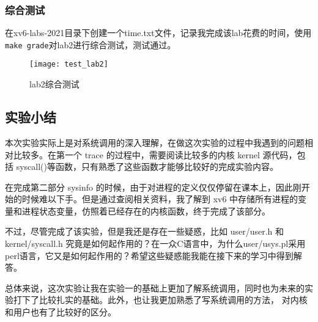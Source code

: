 \subsubsection{综合测试}

在xv6-labs-2021目录下创建一个time.txt文件，记录我完成该lab花费的时间，使用\texttt{make grade}对lab2进行综合测试，测试通过。

\begin{figure}[!htb]
	\centering
	\texttt{[image: test\_lab2]}
	\caption{lab2综合测试}
	\label{fig:test_lab2}
\end{figure}

\subsection{实验小结}

本次实验实际上是对系统调用的深入理解，在做这次实验的过程中我遇到的问题相对比较多。在第一个 trace 的过程中，需要阅读比较多的内核 kernel 源代码，包括 syscall()等函数，只有熟悉了这些函数才能够比较好的完成实验内容。

在完成第二部分 sysinfo 的时候，由于对进程的定义仅仅停留在课本上，因此刚开始的时候难以下手。但是通过查阅相关资料，我了解到 xv6 中存储所有进程的变量和进程状态变量，仿照着已经存在的内核函数，终于完成了该部分。

不过，尽管完成了该实验，但是我还是存在一些疑惑，比如 user/user.h 和 kernel/syscall.h 究竟是如何起作用的？在一众C语言中，为什么user/usys.pl采用perl语言，它又是如何起作用的？希望这些疑惑能我能在接下来的学习中得到解答。

总体来说，这次实验让我在实验一的基础上更加了解系统调用，同时也为未来的实验打下了比较扎实的基础。此外，也让我更加熟悉了写系统调用的方法， 对内核和用户也有了比较好的区分。
